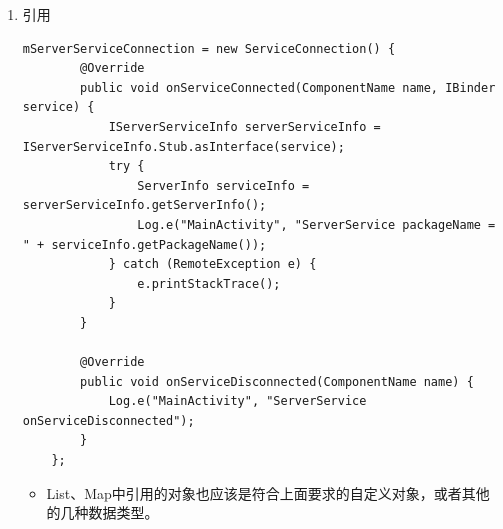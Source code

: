 \documentclass[9pt, b5paper]{article}
\begin{document}
\begin{enumerate}
\begin{enumerate}
\item 引用
\label{sec-1-6-1-3-5}
\begin{verbatim}
mServerServiceConnection = new ServiceConnection() {
        @Override
        public void onServiceConnected(ComponentName name, IBinder service) {
            IServerServiceInfo serverServiceInfo = IServerServiceInfo.Stub.asInterface(service);
            try {
                ServerInfo serviceInfo = serverServiceInfo.getServerInfo();
                Log.e("MainActivity", "ServerService packageName = " + serviceInfo.getPackageName());
            } catch (RemoteException e) {
                e.printStackTrace();
            }
        }

        @Override
        public void onServiceDisconnected(ComponentName name) {
            Log.e("MainActivity", "ServerService onServiceDisconnected");
        }
    };
\end{verbatim}
\begin{itemize}
\item List、Map中引用的对象也应该是符合上面要求的自定义对象，或者其他的几种数据类型。
\end{itemize}
\end{enumerate}
\end{enumerate}
\end{document}
